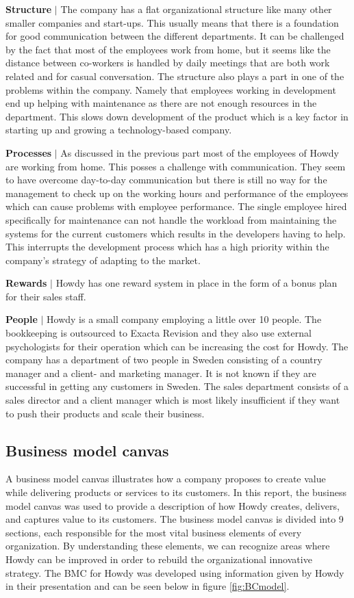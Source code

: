 \noindent \textbf{Structure} $|$ The company has a flat organizational structure like many other smaller companies and start-ups. This usually means that there is a foundation for good communication between the different departments. It can be challenged by the fact that most of the employees work from home, but it seems like the distance between co-workers is handled by daily meetings that are both work related and for casual conversation. The structure also plays a part in one of the problems within the company. Namely that employees working in development end up helping with maintenance as there are not enough resources in the department. This slows down development of the product which is a key factor in starting up and growing a technology-based company.

\noindent \textbf{Processes} $|$ As discussed in the previous part most of the employees of Howdy are working from home. This posses a challenge with communication. They seem to have overcome day-to-day communication but there is still no way for the management to check up on the working hours and performance of the employees which can cause problems with employee performance. The single employee hired specifically for maintenance can not handle the workload from maintaining the systems for the current customers which results in the developers having to help. This interrupts the development process which has a high priority within the company’s strategy of adapting to the market.

\noindent \textbf{Rewards} $|$ Howdy has one reward system in place in the form of a bonus plan for their sales staff.

\noindent \textbf{People} $|$ Howdy is a small company employing a little over 10 people. The bookkeeping is outsourced to Exacta Revision and they also use external psychologists for their operation which can be increasing the cost for Howdy.
The company has a department of two people in Sweden consisting of a country manager and a client- and marketing manager. It is not known if they are successful in getting any customers in Sweden.
The sales department consists of a sales director and a client manager which is most likely insufficient if they want to push their products and scale their business.


\subsection{Business model canvas}
A business model canvas illustrates how a company proposes to create value while delivering products or services to its customers. In this report, the business model canvas was used to provide a description of how Howdy creates, delivers, and captures value to its customers. The business model canvas is divided into 9 sections, each responsible for the most vital business elements of every organization. By understanding these elements, we can recognize areas where Howdy can be improved in order to rebuild the organizational innovative strategy. The BMC for Howdy was developed using information given by Howdy in their presentation \cite{oneofthepresentations} and can be seen below in figure \ref{fig:BCmodel}.

